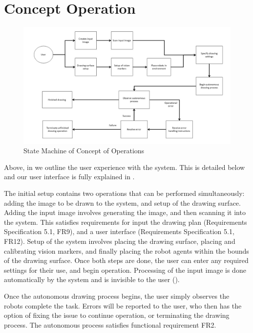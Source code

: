 
\pagebreak
\section{Concept Operation}
\label{sec:concept_operation}

\begin{figure}[h!]
 \centering
  \includegraphics[width=0.90\columnwidth]{diagrams/concept_operation_user.jpg}
	\caption{State Machine of Concept of Operations}
 \label{fig:concept_operation}
\end{figure}

Above, in  we outline the user experience with the system. This is detailed below and our user interface is fully explained in .

The initial setup contains two operations that can be performed simultaneously: adding the image to be drawn to the system, and setup of the drawing surface. Adding the input image involves generating the image, and then scanning it into the system. This satisfies requirements for input the drawing plan (Requirements Specification 5.1, FR9), and a user interface (Requirements Specification 5.1, FR12). Setup of the system involves placing the drawing surface, placing and calibrating vision markers, and finally placing the robot agents within the bounds of the drawing surface. Once both steps are done, the user can enter any required settings for their use, and begin operation. Processing of the input image is done automatically by the system and is invisible to the user ().

Once the autonomous drawing process begins, the user simply observes the robots  complete the task. Errors will be reported to the user, who then has the option of fixing the issue to continue operation, or terminating the drawing process. The autonomous process satisfies functional requirement FR2.
